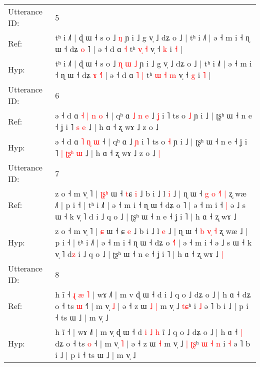 \documentclass[10pt]{article}
\DeclareRobustCommand{\hl}[1]{{\textcolor{red}{#1}}}
\begin{document}
\begin{longtable}{ll}
Utterance ID: & 5 \\
Ref: & tʰ i ˩˥ | ɖ ɯ ˧ s o ˩\hl{}\hl{}\hl{}\hl{} \hl{ŋ} ɲ i ˩ g v̩ ˩ dʑ o ˩ | tʰ i ˩˥ | ə ˧ m i ˧ ɳ ɯ ˧ dʑ \hl{o} \hl{}˥ | ə ˧ d ɑ\hl{}\hl{} \hl{˧} tʰ \hl{}\hl{v}\hl{̩} \hl{˧} v̩ ˧ \hl{k} i \hl{˧} |
 \\
Hyp: & tʰ i ˩˥ | ɖ ɯ ˧ s o ˩\hl{ }\hl{ɳ}\hl{ }\hl{ɯ} \hl{˩} ɲ i ˩ g v̩ ˩ dʑ o ˩ | tʰ i ˩˥ | ə ˧ m i ˧ ɳ ɯ ˧ dʑ \hl{ɤ} \hl{˧}˥ | ə ˧ d ɑ\hl{ }\hl{˥} \hl{|} tʰ \hl{ɯ}\hl{ }\hl{˧} \hl{m} v̩ ˧ \hl{g} i \hl{˥} |
 \\
\midrule
Utterance ID: & 6 \\
Ref: & ə ˧ d ɑ\hl{ }\hl{˧} \hl{|} \hl{n} \hl{o} ˧ | qʰ ɑ\hl{ }\hl{˩}\hl{ }\hl{n}\hl{ }\hl{e} ˩ \hl{ʝ} i ˥ ts o \hl{˩} ɲ i ˩ | ʈʂʰ ɯ ˧ n e ˧ ʝ i ˥\hl{}\hl{} \hl{}\hl{}\hl{s} \hl{e} ˩ | h ɑ ˧ ʐ wɤ ˩ z o ˩\hl{}\hl{}
 \\
Hyp: & ə ˧ d ɑ\hl{}\hl{} \hl{˥} \hl{ɳ} \hl{ɯ} ˧ | qʰ ɑ\hl{}\hl{}\hl{}\hl{}\hl{}\hl{} ˩ \hl{ɲ} i ˥ ts o \hl{˧} ɲ i ˩ | ʈʂʰ ɯ ˧ n e ˧ ʝ i ˥\hl{ }\hl{|} \hl{ʈ}\hl{ʂ}\hl{ʰ} \hl{ɯ} ˩ | h ɑ ˧ ʐ wɤ ˩ z o ˩\hl{ }\hl{|}
 \\
\midrule
Utterance ID: & 7 \\
Ref: & z o ˧ m v̩ ˥ | \hl{ʈ}\hl{ʂ}\hl{ʰ} ɯ ˧ \hl{t}ɕ \hl{i} ˩ b i ˩ l \hl{i} ˩ | ɳ ɯ ˧\hl{ }\hl{g} \hl{o} \hl{˧}\hl{˥} \hl{|} ʐ wæ ˩\hl{˥} | p i ˧ | tʰ i ˩˥ | ə ˧ m i ˧ ɳ ɯ ˧ dʑ o \hl{}˥ | ə ˧ m i ˧\hl{ }\hl{|} ə ˩ s ɯ ˧ k v̩ ˥ d\hl{} i ˩ q o ˩ | ʈʂʰ ɯ ˧ n e ˧ ʝ i ˥ | h ɑ ˧ ʐ wɤ ˩\hl{}\hl{}
 \\
Hyp: & z o ˧ m v̩ ˥ | \hl{}\hl{}\hl{ɕ} ɯ ˧ \hl{}ɕ \hl{e} ˩ b i ˩ l \hl{e} ˩ | ɳ ɯ ˧\hl{}\hl{} \hl{b} \hl{v}\hl{̩} \hl{˧} ʐ wæ ˩\hl{} | p i ˧ | tʰ i ˩˥ | ə ˧ m i ˧ ɳ ɯ ˧ dʑ o \hl{˧}˥ | ə ˧ m i ˧\hl{}\hl{} ə ˩ s ɯ ˧ k v̩ ˥ d\hl{z} i ˩ q o ˩ | ʈʂʰ ɯ ˧ n e ˧ ʝ i ˥ | h ɑ ˧ ʐ wɤ ˩\hl{ }\hl{|}
 \\
\midrule
Utterance ID: & 8 \\
Ref: & h ĩ ˧\hl{ }\hl{ɻ}\hl{ }\hl{æ}\hl{ }\hl{˥} | wɤ ˩˥ | m v\hl{} ɖ ɯ ˧ d\hl{}\hl{}\hl{}\hl{}\hl{}\hl{} i\hl{} ˩ q o ˩ dʑ o ˩ | h ɑ ˧\hl{}\hl{} dʑ o ˧ ts \hl{ɯ} ˧\hl{˥} | m v̩ \hl{˩} | ə ˧ z ɯ\hl{ }\hl{˩} \hl{|} m v̩ ˩\hl{}\hl{} \hl{t}\hl{ɕ}ʰ\hl{}\hl{}\hl{}\hl{}\hl{}\hl{} i \hl{˩} ə ˥ b i ˩ | p i ˧ ts ɯ ˩ | m v̩ ˩
 \\
Hyp: & h ĩ ˧\hl{}\hl{}\hl{}\hl{}\hl{}\hl{} | wɤ ˩˥ | m v\hl{̩} ɖ ɯ ˧ d\hl{ }\hl{i}\hl{ }\hl{˩}\hl{ }\hl{h} i\hl{̃} ˩ q o ˩ dʑ o ˩ | h ɑ ˧\hl{ }\hl{|} dʑ o ˧ ts \hl{o} ˧\hl{} | m v̩ \hl{˥} | ə ˧ z ɯ\hl{}\hl{} \hl{˧} m v̩ ˩\hl{ }\hl{|} \hl{ʈ}\hl{ʂ}ʰ\hl{ }\hl{ɯ}\hl{ }\hl{˧}\hl{ }\hl{n} i \hl{˧} ə ˥ b i ˩ | p i ˧ ts ɯ ˩ | m v̩ ˩

\end{longtable}
\end{document}
